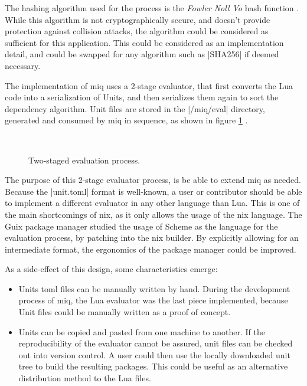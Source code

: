 The hashing algorithm used for the process is the
\textit{Fowler Noll Vo} hash function \cite{FnvRust}. While
this algorithm is not cryptographically secure, and doesn't
provide protection against collision attacks, the algorithm
could be considered as sufficient for this application. This
could be considered as an implementation detail, and could
be swapped for any algorithm such as |SHA256| if deemed
necessary.

The implementation of miq uses a 2-stage evaluator, that
first converts the Lua code into a serialization of Units,
and then serializes them again to sort the dependency
algorithm. Unit files are stored in the |/miq/eval|
directory, generated and consumed by miq in sequence, as
shown in figure \ref{fig:2stage} .

\begin{figure}[hbt]
    \centerfloat
    \
    \caption{Two-staged evaluation process.}
    \label{fig:2stage}
\end{figure}

The purpose of this 2-stage evaluator process, is be able to
extend miq as needed. Because the |unit.toml| format is
well-known, a user or contributor should be able to
implement a different evaluator in any other language than
Lua. This is one of the main shortcomings of nix, as it
only allows the usage of the nix language. The Guix package
manager \cite{courtesFunctionalPackageManagement2013}
studied the usage of Scheme as the language for the
evaluation process, by patching into the nix builder. By
explicitly allowing for an intermediate format, the
ergonomics of the package manager could be improved.

As a side-effect of this design, some characteristics
emerge:

\begin{itemize}
    \item Units toml files can be manually written by hand.
    During the development process of miq, the Lua evaluator
    was the last piece implemented, because Unit files could
    be manually written as a proof of concept.
    \item Units can be copied and pasted from one machine to
    another. If the reproducibility of the evaluator cannot
    be assured, unit files can be checked out into version
    control. A user could then use the locally downloaded
    unit tree to build the resulting packages. This could be
    useful as an alternative distribution method to the Lua files.
\end{itemize}

